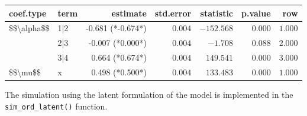 \documentclass[
  man,floatsintext]{apa6}
\begin{document}
\begin{longtable}{llrrrrr}
\toprule
coef.type & term & estimate & std.error & statistic & p.value & row \\ 
\midrule
\$\$\textbackslash{}alpha\$\$ & 1|2 & -0.681 (*-0.674*) & $0.004$ & $-152.568$ & $0.000$ & $1.000$ \\ 
 & 2|3 & -0.007 (*0.000*) & $0.004$ & $-1.708$ & $0.088$ & $2.000$ \\ 
 & 3|4 & 0.664 (*0.674*) & $0.004$ & $149.541$ & $0.000$ & $3.000$ \\ 
\$\$\textbackslash{}mu\$\$ & x & 0.498 (*0.500*) & $0.004$ & $133.483$ & $0.000$ & $1.000$ \\ 
\bottomrule
\end{longtable}

The simulation using the latent formulation of the model is implemented in the \texttt{sim\_ord\_latent()} function.
\end{document}
